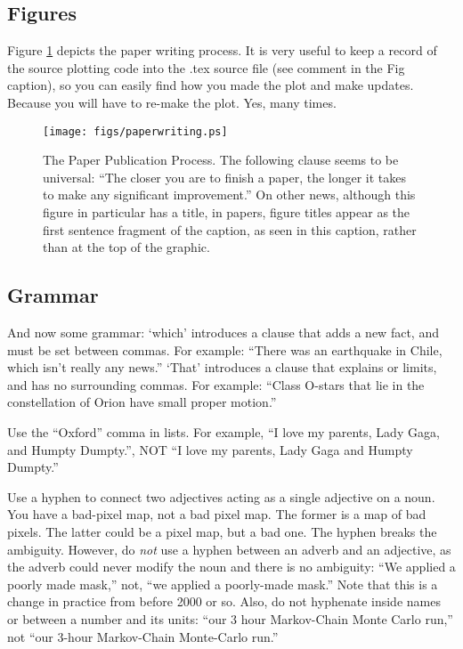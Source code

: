 \subsection{Figures}
\label{sec:figures}

Figure \ref{fig:writing} depicts the paper writing process.  It is
very useful to keep a record of the source plotting code into the .tex
source file (see comment in the Fig caption), so you can
easily find how you made the plot and make updates.  Because you will
have to re-make the plot. Yes, many times.

\begin{figure}[tb]
\centering
\texttt{[image: figs/paperwriting.ps]}
\caption{The Paper Publication Process.  The following clause seems to be
  universal: ``The closer you are to finish a paper, the longer it
  takes to make any significant improvement.''  On other news,
  although this figure in particular has a title, in papers, figure titles
  appear as the first sentence fragment of the
  caption, as seen in this caption, rather than at the top of the
  graphic.}
\label{fig:writing}
\end{figure}


\subsection{Grammar}
\label{sec:grammar}

And now some grammar: `which' introduces a clause that adds a new fact,
and must be set between commas.  For example: ``There was an earthquake
in Chile, which isn't really any news.''  `That' introduces a clause
that explains or limits, and has no surrounding commas.  For example:
``Class O-stars that lie in the constellation of Orion have small proper
motion.''

Use the ``Oxford'' comma in lists.  For example, ``I love my parents, Lady Gaga, and Humpty Dumpty.'', NOT ``I love my parents, Lady Gaga and Humpty Dumpty.''

Use a hyphen to connect two adjectives acting as a single adjective on
a noun.  You have a bad-pixel map, not a bad pixel map.  The former is
a map of bad pixels.  The latter could be a pixel map, but a bad one.
The hyphen breaks the ambiguity.  However, do {\em not}\/ use a hyphen
between an adverb and an adjective, as the adverb could never modify
the noun and there is no ambiguity: ``We applied a poorly made mask,''
not, ``we applied a poorly-made mask.''  Note that this is a change in
practice from before 2000 or so.  Also, do not hyphenate inside names
or between a number and its units: ``our 3 hour Markov-Chain Monte
Carlo run,'' not ``our 3-hour Markov-Chain Monte-Carlo run.''


